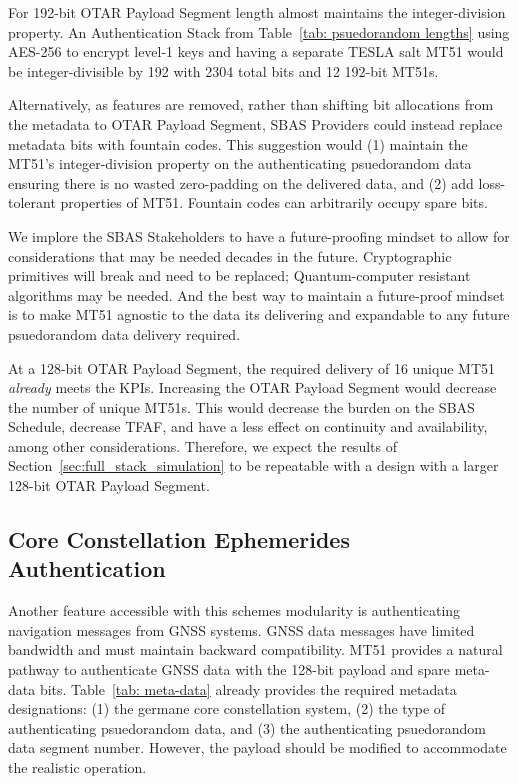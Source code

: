 \documentclass[APA,STIX1COL]{IONjournal/ION-APA Template}
\begin{document}
		For 192-bit OTAR Payload Segment length almost maintains the integer-division property.
		An Authentication Stack from Table~\ref{tab: psuedorandom lengths} using AES-256 to encrypt level-1 keys and having a separate TESLA salt MT51 would be integer-divisible by 192 with 2304 total bits and 12 192-bit MT51s.

		Alternatively, as features are removed, rather than shifting bit allocations from the metadata to OTAR Payload Segment, SBAS Providers could instead replace metadata bits with fountain codes.
		This suggestion would (1) maintain the MT51's integer-division property on the authenticating psuedorandom data ensuring there is no wasted zero-padding on the delivered data, and (2) add loss-tolerant properties of MT51.
		Fountain codes can arbitrarily occupy spare bits.
		
		We implore the SBAS Stakeholders to have a future-proofing mindset to allow for considerations that may be needed decades in the future.
		Cryptographic primitives will break and need to be replaced; Quantum-computer resistant algorithms may be needed.
		And the best way to maintain a future-proof mindset is to make MT51 agnostic to the data its delivering and expandable to any future psuedorandom data delivery required.

		At a 128-bit OTAR Payload Segment, the required delivery of 16 unique MT51 {\em already} meets the KPIs.
		Increasing the OTAR Payload Segment would decrease the number of unique MT51s.
		This would decrease the burden on the SBAS Schedule, decrease TFAF, and have a less effect on continuity and availability, among other considerations.
		Therefore, we expect the results of Section~\ref{sec:full_stack_simulation} to be repeatable with a design with a larger 128-bit OTAR Payload Segment.

	\subsection{Core Constellation Ephemerides Authentication} \label{sub:core_eph}

		Another feature accessible with this schemes modularity is authenticating navigation messages from GNSS systems.
		GNSS data messages have limited bandwidth and must maintain backward compatibility.
		MT51 provides a natural pathway to authenticate GNSS data with the 128-bit payload and spare meta-data bits.
		Table~\ref{tab: meta-data} already provides the required metadata designations: (1) the germane core constellation system, (2) the type of authenticating psuedorandom data, and (3) the authenticating psuedorandom data segment number.
		However, the payload should be modified to accommodate the realistic operation.
\end{document}

